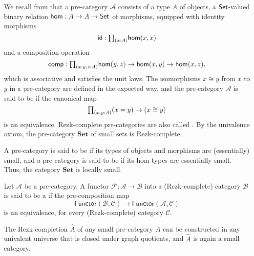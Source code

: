 We recall from \cite{AhrensKapulkinShulman} that a pre-category $\mathcal{A}$ consists of a type $A$ of objects, a $\mathsf{Set}$-valued binary relation $\mathsf{hom}:A\to A\to\mathsf{Set}$ of morphisms, equipped with identity morphisms
\begin{equation*}
\mathsf{id} : \prd{x:A} \mathsf{hom}(x,x)
\end{equation*}
and a composition operation
\begin{equation*}
\mathsf{comp} : \prd{x,y,z:A} \mathsf{hom}(y,z)\to \mathsf{hom}(x,y)\to \mathsf{hom}(x,z),
\end{equation*}
which is associative and satisfies the unit laws. The isomorphisms $x \cong y$ from $x$ to $y$ in a pre-category are defined in the expected way, and the pre-category $\mathcal{A}$ is said to be  if the canonical map
\begin{equation*}
\prd{x,y:A} (x=y)\to (x\cong y)
\end{equation*}
is an equivalence. Rezk-complete pre-categories are also called . By the univalence axiom, the pre-category $\mathbf{Set}$ of small sets is Rezk-complete. 

A pre-category is said to be  if its types of objects and morphisms are (essentially) small, and a pre-category is said to be  if its hom-types are essentially small. Thus, the category $\mathbf{Set}$ is locally small. 

\begin{defn}
Let $\mathcal{A}$ be a pre-category. A functor $\mathcal{F}:\mathcal{A}\to\mathcal{B}$ into a (Rezk-complete) category $\mathcal{B}$ is said to be a  if the pre-composition map
\begin{equation*}
\mathsf{Functor}(\mathcal{B},\mathcal{C})\to\mathsf{Functor}(\mathcal{A},\mathcal{C})
\end{equation*}
is an equivalence, for every (Rezk-complete) category $\mathcal{C}$. 
\end{defn}

\begin{thm}\label{cor:rezkcompletion}
The Rezk completion $\hat{A}$ of any small pre-category $A$ can be constructed in any 
univalent universe that is closed under graph quotients,
and $\hat{A}$ is again a small category. 
\end{thm}

